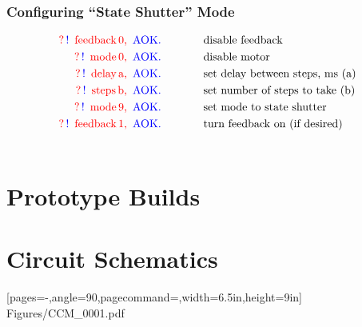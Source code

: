 \documentclass[10pt]{article}
\newcommand{\comm}[3]{
\nonumber \textcolor{red}{?} \, \textcolor{blue}{!} \, \textcolor{red}{\text{ #1}} \,\textcolor{red}{\text{#2, }} \, \textcolor{blue}{\text{AOK.}} \, & \text{\hspace{0.5in}#3}}
\begin{document}
\subsubsection{Configuring ``State Shutter'' Mode}
\begin{align}
\comm{feedback}{0}{disable feedback} \\
\comm{mode}{0}{disable motor} \\
\comm{delay}{a}{set delay between steps, ms (a)} \\
\comm{steps}{b}{set number of steps to take (b)} \\
\comm{mode}{9}{set mode to state shutter} \\
\comm{feedback}{1}{turn feedback on (if desired)} \\
\nonumber
\end{align}

\newpage
\FloatBarrier
\section{Prototype Builds}
\label{Prototype_Builds} 



\newpage
\FloatBarrier
\section{Circuit Schematics}
\label{Circuit_Schematics}    

			
[pages=-,angle=90,pagecommand={},width=6.5in,height=9in]
{Figures/CCM_0001.pdf}
\end{document}
